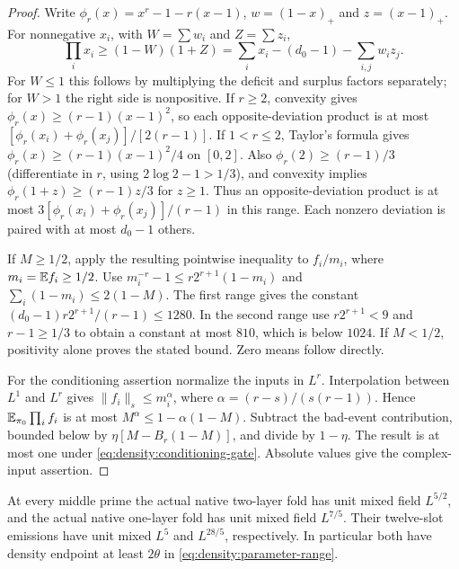 \begin{proof}
Write $\phi_r(x)=x^r-1-r(x-1)$, $w=(1-x)_+$ and $z=(x-1)_+$.
For nonnegative $x_i$, with $W=\sum w_i$ and $Z=\sum z_i$,
\[
 \prod_i x_i\ge(1-W)(1+Z)
 =\sum_i x_i-(d_0-1)-\sum_{i,j}w_i z_j.
\]
For $W\le1$ this follows by multiplying the deficit and surplus
factors separately; for $W>1$ the right side is nonpositive.
If $r\ge2$, convexity gives
$\phi_r(x)\ge(r-1)(x-1)^2$, so each opposite-deviation product is at
most $[\phi_r(x_i)+\phi_r(x_j)]/[2(r-1)]$.
If $1<r\le2$, Taylor's formula gives
$\phi_r(x)\ge(r-1)(x-1)^2/4$ on $[0,2]$.
Also $\phi_r(2)\ge(r-1)/3$ (differentiate in $r$, using
$2\log2-1>1/3$), and convexity implies
$\phi_r(1+z)\ge(r-1)z/3$ for $z\ge1$.
Thus an opposite-deviation product is at most
$3[\phi_r(x_i)+\phi_r(x_j)]/(r-1)$ in this range.
Each nonzero deviation is paired with at most $d_0-1$ others.

If $M\ge1/2$, apply the resulting pointwise inequality to $f_i/m_i$,
where $m_i=\mathbb E f_i\ge1/2$. Use
$m_i^{-r}-1\le r2^{r+1}(1-m_i)$ and
$\sum_i(1-m_i)\le2(1-M)$. The first range gives the constant
$(d_0-1)r2^{r+1}/(r-1)\le1280$. In the second range use
$r2^{r+1}<9$ and $r-1\ge1/3$ to obtain a constant at most $810$,
which is below $1024$. If $M<1/2$, positivity alone proves the stated
bound. Zero means follow directly.

For the conditioning assertion normalize the inputs in $L^r$.
Interpolation between $L^1$ and $L^r$ gives
$\|f_i\|_s\le m_i^\alpha$, where
$\alpha=(r-s)/(s(r-1))$. Hence $\mathbb E_{\pi_0}\prod_i f_i$ is at most $M^\alpha\le1-\alpha(1-M)$. Subtract the bad-event contribution,
bounded below by $\eta[M-B_r(1-M)]$, and divide by $1-\eta$.
The result is at most one under \eqref{eq:density:conditioning-gate}.
Absolute values give the complex-input assertion.
\end{proof}

\begin{lemma}\label{lem:density:strong-F}
At every middle prime the actual native two-layer fold has unit mixed
field $L^{5/2}$, and the actual native one-layer fold has unit mixed
field $L^{7/5}$. Their twelve-slot emissions have unit mixed $L^5$
and $L^{28/5}$, respectively. In particular both have density endpoint at least $2\theta$ in \eqref{eq:density:parameter-range}.
\end{lemma}

